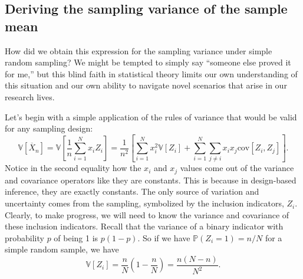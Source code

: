 \documentclass[
  letterpaper,
  DIV=11,
  numbers=noendperiod]{scrreprt}
\newcommand{\V}{\mathbb{V}}
\newcommand{\cov}{\text{cov}}
\renewcommand{\P}{\mathbb{P}}
\newcommand{\Xbar}{\overline{X}}
\theoremstyle{definition}
\theoremstyle{definition}
\theoremstyle{plain}
\theoremstyle{remark}
\begin{document}
\hypertarget{deriving-the-sampling-variance-of-the-sample-mean}{%
\subsection{Deriving the sampling variance of the sample
mean}\label{deriving-the-sampling-variance-of-the-sample-mean}}

How did we obtain this expression for the sampling variance under simple
random sampling? We might be tempted to simply say ``someone else proved
it for me,'' but this blind faith in statistical theory limits our own
understanding of this situation and our own ability to navigate novel
scenarios that arise in our research lives.

Let's begin with a simple application of the rules of variance that
would be valid for any sampling design: \[
\V[\Xbar_{n}] = \V\left[\frac{1}{n} \sum_{i=1}^N x_iZ_i\right] = \frac{1}{n^2}\left[\sum_{i=1}^N x_i^2\V[Z_i] + \sum_{i=1}^N\sum_{j\neq i} x_ix_j\cov[Z_i,Z_j]\right].
\] Notice in the second equality how the \(x_i\) and \(x_j\) values come
out of the variance and covariance operators like they are constants.
This is because in design-based inference, they are exactly constants.
The only source of variation and uncertainty comes from the sampling,
symbolized by the inclusion indicators, \(Z_i\). Clearly, to make
progress, we will need to know the variance and covariance of these
inclusion indicators. Recall that the variance of a binary indicator
with probability \(p\) of being 1 is \(p(1 - p)\). So if we have
\(\P(Z_i = 1) = n/N\) for a simple random sample, we have \[
\V[Z_i] = \frac{n}{N}\left(1 - \frac{n}{N}\right) = \frac{n(N - n)}{N^2}.
\]
\end{document}
